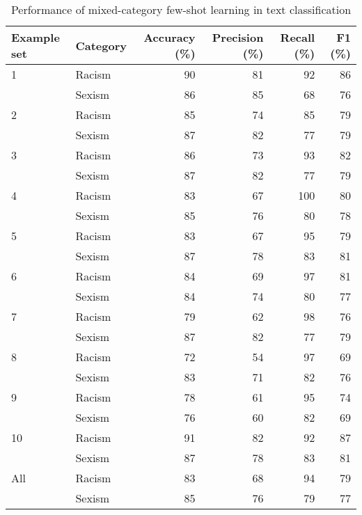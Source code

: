 \documentclass{bmcart}
\begin{document}
\begin{backmatter}
\begin{table}
\caption{\label{tab:fewshotmixed-summary}Performance of mixed-category few-shot learning in text classification}
\centering
\begin{tabular}[t]{llrrrr}
\hline
Example set & Category & Accuracy (\%) & Precision (\%) & Recall (\%) & F1 (\%)\\
\hline
1 & Racism & 90 & 81 & 92 & 86\\
 & Sexism & 86 & 85 & 68 & 76\\
\hline
2 & Racism & 85 & 74 & 85 & 79\\
 & Sexism & 87 & 82 & 77 & \vphantom{2} 79\\
\hline
3 & Racism & 86 & 73 & 93 & 82\\
 & Sexism & 87 & 82 & 77 & \vphantom{1} 79\\
\hline
4 & Racism & 83 & 67 & 100 & 80\\
 & Sexism & 85 & 76 & 80 & 78\\
\hline
5 & Racism & 83 & 67 & 95 & 79\\
 & Sexism & 87 & 78 & 83 & \vphantom{1} 81\\
\hline
6 & Racism & 84 & 69 & 97 & 81\\
 & Sexism & 84 & 74 & 80 & 77\\
\hline
7 & Racism & 79 & 62 & 98 & 76\\
 & Sexism & 87 & 82 & 77 & 79\\
\hline
8 & Racism & 72 & 54 & 97 & 69\\
 & Sexism & 83 & 71 & 82 & 76\\
\hline
9 & Racism & 78 & 61 & 95 & 74\\
 & Sexism & 76 & 60 & 82 & 69\\
\hline
10 & Racism & 91 & 82 & 92 & 87\\
 & Sexism & 87 & 78 & 83 & 81\\
\hline
All & Racism & 83 & 68 & 94 & 79\\
 & Sexism & 85 & 76 & 79 & 77\\
\hline
\end{tabular}
\end{table}







\begin{table}


\end{table}
\end{backmatter}
\end{document}
